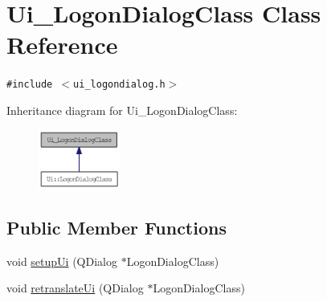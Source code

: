 \hypertarget{class_ui___logon_dialog_class}{
\section{Ui\_\-LogonDialogClass Class Reference}
\label{class_ui___logon_dialog_class}
}
{\tt \#include $<$ui\_\-logondialog.h$>$}

Inheritance diagram for Ui\_\-LogonDialogClass:\nopagebreak
\begin{figure}[H]
\begin{center}
\leavevmode
\includegraphics[width=76pt]{class_ui___logon_dialog_class__inherit__graph}
\end{center}
\end{figure}
\subsection*{Public Member Functions}
\begin{CompactItemize}
\item 
void \hyperlink{class_ui___logon_dialog_class_eb9d8373b0591536ac65680deb7fecb8}{setupUi} (QDialog $\ast$LogonDialogClass)
\item 
void \hyperlink{class_ui___logon_dialog_class_02e27cd8fdcb0196bd54d19c92fdfe96}{retranslateUi} (QDialog $\ast$LogonDialogClass)
\end{CompactItemize}
